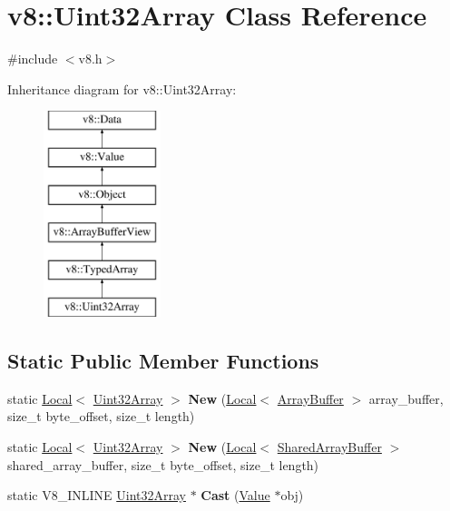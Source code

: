 \hypertarget{classv8_1_1Uint32Array}{}\section{v8\+:\+:Uint32\+Array Class Reference}
\label{classv8_1_1Uint32Array}


{\ttfamily \#include $<$v8.\+h$>$}

Inheritance diagram for v8\+:\+:Uint32\+Array\+:\begin{figure}[H]
\begin{center}
\leavevmode
\includegraphics[height=6.000000cm]{classv8_1_1Uint32Array}
\end{center}
\end{figure}
\subsection*{Static Public Member Functions}
\begin{DoxyCompactItemize}
\item 
\mbox{\label{classv8_1_1Uint32Array_ab8dbef5ff846fc6cc9381bc29f744b5b}} 
static \mbox{\hyperlink{classv8_1_1Local}{Local}}$<$ \mbox{\hyperlink{classv8_1_1Uint32Array}{Uint32\+Array}} $>$ {\bfseries New} (\mbox{\hyperlink{classv8_1_1Local}{Local}}$<$ \mbox{\hyperlink{classv8_1_1ArrayBuffer}{Array\+Buffer}} $>$ array\+\_\+buffer, size\+\_\+t byte\+\_\+offset, size\+\_\+t length)
\item 
\mbox{\label{classv8_1_1Uint32Array_a03da1a9371316818a926d2b8231ac33a}} 
static \mbox{\hyperlink{classv8_1_1Local}{Local}}$<$ \mbox{\hyperlink{classv8_1_1Uint32Array}{Uint32\+Array}} $>$ {\bfseries New} (\mbox{\hyperlink{classv8_1_1Local}{Local}}$<$ \mbox{\hyperlink{classv8_1_1SharedArrayBuffer}{Shared\+Array\+Buffer}} $>$ shared\+\_\+array\+\_\+buffer, size\+\_\+t byte\+\_\+offset, size\+\_\+t length)
\item 
\mbox{\label{classv8_1_1Uint32Array_ad40e645ee0abac443dba759ee861de49}} 
static V8\+\_\+\+I\+N\+L\+I\+NE \mbox{\hyperlink{classv8_1_1Uint32Array}{Uint32\+Array}} $\ast$ {\bfseries Cast} (\mbox{\hyperlink{classv8_1_1Value}{Value}} $\ast$obj)
\end{DoxyCompactItemize}
